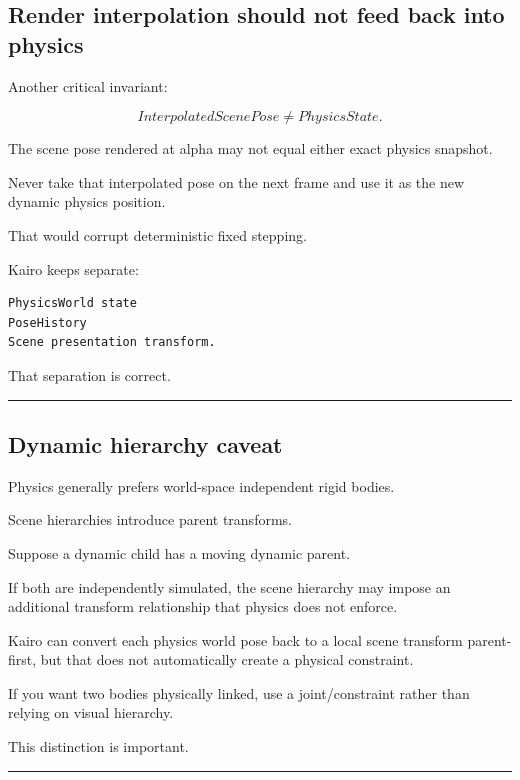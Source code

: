 \subsection{Render interpolation should not feed back into physics}\label{06-engine-ii-ch038-render-interpolation-should-not-feed-back-into-physics}

Another critical invariant:

\[
\boxed{
InterpolatedScenePose
\neq
PhysicsState.
}
\]

The scene pose rendered at alpha may not equal either exact physics snapshot.

Never take that interpolated pose on the next frame and use it as the new dynamic physics position.

That would corrupt deterministic fixed stepping.

Kairo keeps separate:

\begin{verbatim}
PhysicsWorld state
PoseHistory
Scene presentation transform.
\end{verbatim}

That separation is correct.

\begin{center}\rule{0.5\linewidth}{0.5pt}\end{center}

\subsection{Dynamic hierarchy caveat}\label{06-engine-ii-ch038-dynamic-hierarchy-caveat}

Physics generally prefers world-space independent rigid bodies.

Scene hierarchies introduce parent transforms.

Suppose a dynamic child has a moving dynamic parent.

If both are independently simulated, the scene hierarchy may impose an additional transform relationship that physics does not enforce.

Kairo can convert each physics world pose back to a local scene transform parent-first, but that does not automatically create a physical constraint.

If you want two bodies physically linked, use a joint/constraint rather than relying on visual hierarchy.

This distinction is important.

\begin{center}\rule{0.5\linewidth}{0.5pt}\end{center}

